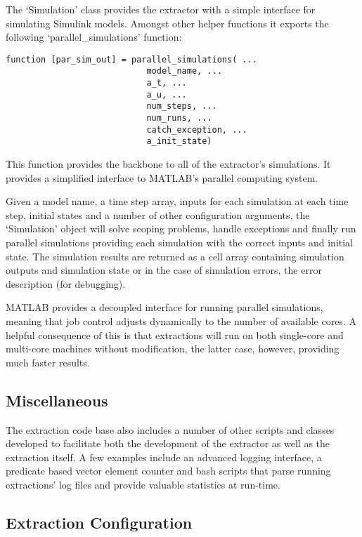 The `Simulation' class provides the extractor with a simple interface for simulating Simulink models. Amongst other helper functions it exports the following `parallel\_simulations' function:

\begin{verbatim}
function [par_sim_out] = parallel_simulations( ...
                            model_name, ...
                            a_t, ...
                            a_u, ...
                            num_steps, ...
                            num_runs, ...
                            catch_exception, ...
                            a_init_state)
\end{verbatim}

This function provides the backbone to all of the extractor's simulations. It provides a simplified interface to MATLAB's parallel computing system.

Given a model name, a time step array, inputs for each simulation at each time step, initial states and a number of other configuration arguments, the `Simulation' object will solve scoping problems, handle exceptions and finally run parallel simulations providing each simulation with the correct inputs and initial state. The simulation results are returned as a cell array containing simulation outputs and simulation state or in the case of simulation errors, the error description (for debugging).

MATLAB provides a decoupled interface for running parallel simulations, meaning that job control adjusts dynamically to the number of available cores. A helpful consequence of this is that extractions will run on both single-core and multi-core machines without modification, the latter case, however, providing much faster results.

\subsection{Miscellaneous}

The extraction code base also includes a number of other scripts and classes developed to facilitate both the development of the extractor as well as the extraction itself. A few examples include an advanced logging interface, a predicate based vector element counter   and bash scripts that parse running extractions' log files and provide valuable statistics at run-time.

\subsection{Extraction Configuration}
\label{subsec:randomsimulink}

